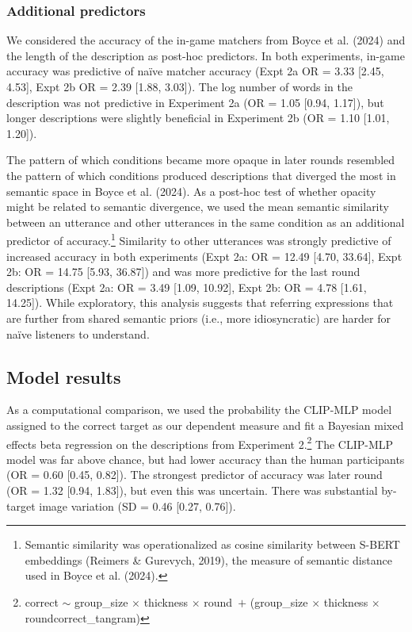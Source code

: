 \documentclass[10pt, letterpaper]{article}
\begin{document}
\subsubsection{Additional predictors}\label{additional-predictors}

We considered the accuracy of the in-game matchers from Boyce et al.
(2024) and the length of the description as post-hoc predictors. In both
experiments, in-game accuracy was predictive of naïve matcher accuracy
(Expt 2a OR = 3.33 {[}2.45, 4.53{]}, Expt 2b OR = 2.39 {[}1.88,
3.03{]}). The log number of words in the description was not predictive
in Experiment 2a (OR = 1.05 {[}0.94, 1.17{]}), but longer descriptions
were slightly beneficial in Experiment 2b (OR = 1.10 {[}1.01, 1.20{]}).

The pattern of which conditions became more opaque in later rounds
resembled the pattern of which conditions produced descriptions that
diverged the most in semantic space in Boyce et al. (2024). As a
post-hoc test of whether opacity might be related to semantic
divergence, we used the mean semantic similarity between an utterance
and other utterances in the same condition as an additional predictor of
accuracy.\footnote{Semantic similarity was operationalized as cosine
  similarity between S-BERT embeddings (Reimers \& Gurevych, 2019), the
  measure of semantic distance used in Boyce et al. (2024).} Similarity
to other utterances was strongly predictive of increased accuracy in
both experiments (Expt 2a: OR = 12.49 {[}4.70, 33.64{]}, Expt 2b: OR =
14.75 {[}5.93, 36.87{]}) and was more predictive for the last round
descriptions (Expt 2a: OR = 3.49 {[}1.09, 10.92{]}, Expt 2b: OR = 4.78
{[}1.61, 14.25{]}). While exploratory, this analysis suggests that
referring expressions that are further from shared semantic priors
(i.e., more idiosyncratic) are harder for naïve listeners to understand.

\subsection{Model results}\label{model-results}

As a computational comparison, we used the probability the CLIP-MLP
model assigned to the correct target as our dependent measure and fit a
Bayesian mixed effects beta regression on the descriptions from
Experiment 2.\footnote{correct \({\sim}\) group\_size \({\times}\)
  thickness \({\times}\) round~\({+}\) (group\_size \({\times}\)
  thickness \({\times}\) round\textbar correct\_tangram)} The CLIP-MLP
model was far above chance, but had lower accuracy than the human
participants (OR = 0.60 {[}0.45, 0.82{]}). The strongest predictor of
accuracy was later round (OR = 1.32 {[}0.94, 1.83{]}), but even this was
uncertain. There was substantial by-target image variation (SD = 0.46
{[}0.27, 0.76{]}).
\end{document}
